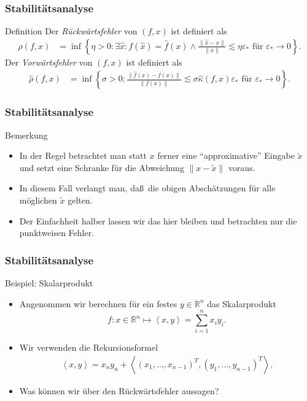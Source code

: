 \documentclass{beamer}
\renewcommand{\emph}[1]{{\textcolor{solarizedRed}{\itshape #1}}}
\newcommand\RR{\mathbb R}
\newcommand{\eps}{\varepsilon}
\newcommand\cbc[1]{\left\{{#1}\right\}}
\newcommand{\bck}[1]{\left\langle{#1}\right\rangle}
\newcommand\scal[2]{\bck{{#1},{#2}}}
\renewcommand{\ae}{\"a}
\newcommand{\ue}{\"u}
\newcommand{\mytitle}{Stabilit\ae tsanalyse}
\begin{document}
\begin{frame}\frametitle{\mytitle}
	\begin{block}{Definition}
		Der \emph{R\"uckw\"artsfehler} von $(f,x)$ ist definiert als
		\begin{align*}
		\rho(f,x)&=\inf\cbc{\eta>0:\exists \hat x:f(\hat x)=\hat f( x)\wedge\frac{\|\hat x-x\|}{\|x\|}\lesssim\eta\eps_*\mbox{ f\ue r }\eps_*\to0 }.
		\end{align*}
		Der \emph{Vorw\"artsfehler} von $(f,x)$ ist definiert als
		\begin{align*}
			\hat\rho(f,x)&=\inf\cbc{\sigma>0:\frac{\|\hat f(x)-f(x)\|}{\|f(x)\|}\lesssim\sigma\hat\kappa(f,x)\eps_*\mbox{ f\ue r }\eps_*\to0}.
		\end{align*}
	\end{block}
\end{frame}

\begin{frame}\frametitle{\mytitle}
	\begin{block}{Bemerkung}
		\begin{itemize}
			\item In der Regel betrachtet man statt $x$ ferner eine ``approximative'' Eingabe $\tilde x$ und setzt eine Schranke f\"ur die Abweichung $\|x-\tilde x\|$ voraus.
			\item In diesem Fall verlangt man, da\ss\ die obigen Absch\"atzungen f\"ur alle m\"oglichen $\tilde x$ gelten.
			\item Der Einfachheit halber lassen wir das hier bleiben und betrachten nur die punktweisen Fehler.
		\end{itemize}
	\end{block}
\end{frame}

\begin{frame}\frametitle{\mytitle}
	\begin{block}{Beispiel: Skalarprodukt}
		\begin{itemize}
			\item Angenommen wir berechnen f\"ur ein festes $y\in\RR^n$ das Skalarprodukt
				$$f:x\in\RR^n\mapsto\scal xy=\sum_{i=1}^nx_iy_i.$$
			\item Wir verwenden die Rekursionsformel
				\begin{align*}
					\scal xy=x_ny_n+\scal{(x_1,\ldots,x_{n-1})^T}{(y_1,\ldots,y_{n-1})^T}.
				\end{align*}
			\item Was k\"onnen wir \"uber den R\"uckw\"artsfehler aussagen?
		\end{itemize}
	\end{block}
\end{frame}
\end{document}
